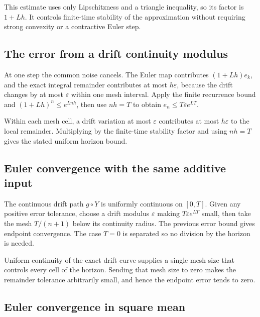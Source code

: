 \documentclass[11pt,a4paper]{report}
\begin{document}
This estimate uses only Lipschitzness and a triangle inequality, so its factor is \(1+Lh\). It controls finite-time stability of the approximation without requiring strong convexity or a contractive Euler step.

\subsection{\texorpdfstring{The error from a drift continuity modulus}{The error from a drift continuity modulus}}
\label{report-step-UnadjustedLangevin-EulerLimit-lean-7}


At one step the common noise cancels. The Euler map contributes \((1+Lh)e_k\), and the exact integral remainder contributes at most \(h\varepsilon\), because the drift changes by at most \(\varepsilon\) within one mesh interval. Apply the finite recurrence bound and \((1+Lh)^n\le e^{Lnh}\), then use \(nh=T\) to obtain \(e_n\le T\varepsilon e^{LT}\).



Within each mesh cell, a drift variation at most \(\varepsilon\) contributes at most \(h\varepsilon\) to the local remainder. Multiplying by the finite-time stability factor and using \(nh=T\) gives the stated uniform horizon bound.

\subsection{\texorpdfstring{Euler convergence with the same additive input}{Euler convergence with the same additive input}}
\label{report-step-UnadjustedLangevin-EulerLimit-lean-8}


The continuous drift path \(g\circ Y\) is uniformly continuous on \([0,T]\). Given any positive error tolerance, choose a drift modulus \(\varepsilon\) making \(T\varepsilon e^{LT}\) small, then take the mesh \(T/(n+1)\) below its continuity radius. The previous error bound gives endpoint convergence. The case \(T=0\) is separated so no division by the horizon is needed.



Uniform continuity of the exact drift curve supplies a single mesh size that controls every cell of the horizon. Sending that mesh size to zero makes the remainder tolerance arbitrarily small, and hence the endpoint error tends to zero.

\subsection{\texorpdfstring{Euler convergence in square mean}{Euler convergence in square mean}}
\label{report-step-UnadjustedLangevin-EulerLimit-lean-9}
\end{document}
